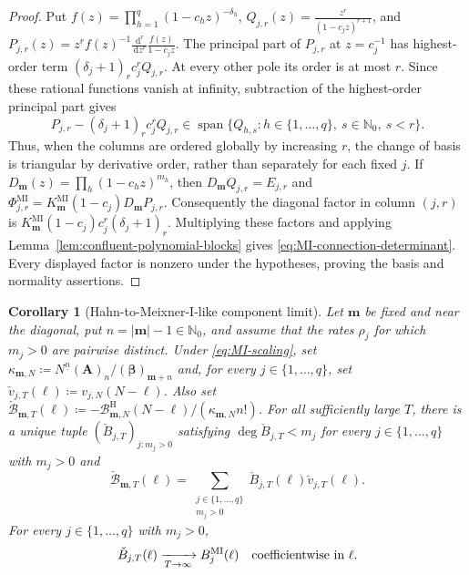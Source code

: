 \documentclass[10pt]{amsart}
\newcommand{\Nzero}{\mathbb N_0}
\newcommand{\dd}{\,\mathrm d}
\newcommand{\A}{\boldsymbol A}
\newcommand{\bbeta}{\boldsymbol\beta}
\newcommand{\mm}{\boldsymbol m}
\newcommand{\abs}[1]{\lvert#1\rvert}
\newcommand{\fall}[2]{#1^{\underline{#2}}}
\theoremstyle{plain}
\newtheorem{corollary}[theorem]{Corollary}
\theoremstyle{definition}
\theoremstyle{remark}
\begin{document}
\begin{proof}
Put \(f(z)=\prod_{h=1}^q(1-c_hz)^{-\delta_h}\),
\(Q_{j,r}(z)=\frac{z^r}{(1-c_jz)^{r+1}}\), and
\(P_{j,r}(z)=z^rf(z)^{-1}
\frac{\dd^r}{\dd z^r}\frac{f(z)}{1-c_jz}\).
The principal part of \(P_{j,r}\) at \(z=c_j^{-1}\) has highest-order
term
\((\delta_j+1)_rc_j^rQ_{j,r}\). At every other pole its order is at
most \(r\). Since these rational functions vanish at infinity, subtraction
of the highest-order principal part gives
\[
 P_{j,r}-(\delta_j+1)_rc_j^rQ_{j,r}
 \in\operatorname{span}\{Q_{h,s}:h\in\{1,\ldots,q\},\
 s\in\Nzero,\ s<r\}.
\]
Thus, when the columns are ordered globally by increasing \(r\), the
change of basis is triangular by derivative order, rather than separately
for each fixed \(j\). If
\(D_{\mm}(z)=\prod_h(1-c_hz)^{m_h}\), then
\(D_{\mm}Q_{j,r}=E_{j,r}\) and
\(\Phi_{j,r}^{\mathrm{MI}}
=K_{\mm}^{\mathrm{MI}}(1-c_j)D_{\mm}P_{j,r}\).
Consequently the diagonal factor in column \((j,r)\) is
\(K_{\mm}^{\mathrm{MI}}(1-c_j)c_j^r(\delta_j+1)_r\).
Multiplying these factors and applying
Lemma~\ref{lem:confluent-polynomial-blocks} gives
\eqref{eq:MI-connection-determinant}. Every displayed factor is nonzero
under the hypotheses, proving the basis and normality assertions.
\end{proof}

\begin{corollary}[Hahn-to-Meixner-I-like component limit]
\label{cor:Hahn-MI-component-limit}
Let \(\mm\) be fixed and near the diagonal, put
\(n=\abs\mm-1\in\Nzero\), and assume that the rates \(\rho_j\) for
which \(m_j>0\) are pairwise distinct. Under \eqref{eq:MI-scaling}, set
\(\kappa_{\mm,N}\coloneq\fall{N}{n}(\A)_n/(\bbeta)_{\mm+n}\) and, for
every \(j\in\{1,\ldots,q\}\), set
\(\check v_{j,T}(\ell)\coloneq v_{j,N}(N-\ell)\). Also set
\(\check{\mathcal B}_{\mm,T}(\ell)
\coloneq-\mathcal B_{\mm,N}^{\mathrm H}(N-\ell)/
(\kappa_{\mm,N}n!)\). For all sufficiently large \(T\), there is a
unique tuple \((\check B_{j,T})_{j:m_j>0}\) satisfying
\(\deg\check B_{j,T}<m_j\) for every
\(j\in\{1,\ldots,q\}\) with \(m_j>0\) and
\[
 \check{\mathcal B}_{\mm,T}(\ell)
 =\sum_{\substack{j\in\{1,\ldots,q\}\\m_j>0}}
 \check B_{j,T}(\ell)\check v_{j,T}(\ell).
\]
For every \(j\in\{1,\ldots,q\}\) with \(m_j>0\),
\begin{equation}
 \check B_{j,T}(\ell)\xrightarrow[T\to\infty]{}B_j^{\mathrm{MI}}(\ell)
 \quad\hbox{coefficientwise in }\ell.
 \label{eq:Hahn-MI-component-limit}
\end{equation}
\end{corollary}
\end{document}
